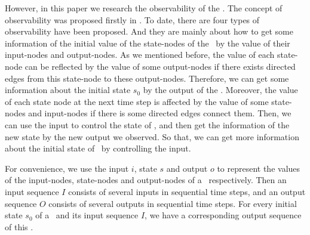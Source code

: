 However, in this paper we research the observability of the \BCNs. The concept of observability was proposed firstly in \cite{cheng2009controllability}. To date, there are four types of observability have been proposed. And they are mainly about how to get some information of the initial value of the state-nodes of the \BCNs\ by the value of their input-nodes and output-nodes. As we mentioned before, the value of each state-node can be reflected by the value of some output-nodes if there exists directed edges from this state-node to these output-nodes. Therefore, we can get some information about the initial state $s_0$ by the output of the \BCN.
Moreover, the value of each state node at the next time step is affected by the value of some state-nodes and input-nodes if there is some directed edges connect them. Then, we can use the input to control the state of \BCNs, and then get the information of the new state by the new output we observed. So that, we can get more information about the initial state of \BCN\ by controlling the input.

For convenience, we use the input $i$, state $s$ and output $o$ to represent the values of the input-nodes, state-nodes and output-nodes of a \BCN\ respectively. Then an input sequence $I$ consists of several inputs in sequential time steps, and an output sequence $O$ consists of several outputs in sequential time steps. For every initial state $s_0$ of a \BCN\ and its input sequence $I$, we have a corresponding output sequence of this \BCN.

